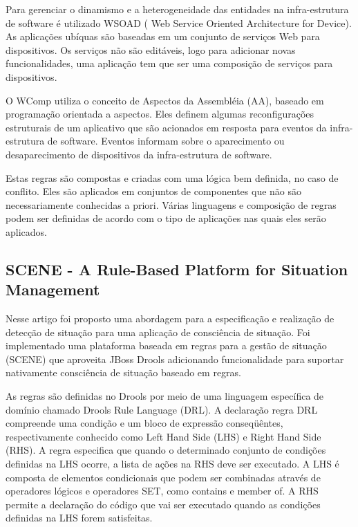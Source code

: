 \documentclass[12pt,a4paper,compsoc]{IEEEtran}
\begin{document}
  Para gerenciar o dinamismo e a heterogeneidade das entidades na infra-estrutura de software é
  utilizado WSOAD ( Web Service Oriented Architecture for Device). As aplicações ubíquas são
  baseadas em um conjunto de serviços Web para dispositivos. Os serviços não são editáveis, logo
  para adicionar novas funcionalidades, uma aplicação tem que ser uma composição de serviços para
  dispositivos.
  
  O WComp utiliza o conceito de Aspectos da Assembléia (AA), baseado em programação orientada a
  aspectos. Eles definem algumas reconfigurações estruturais de um aplicativo que são acionados em
  resposta para eventos da infra-estrutura de software. Eventos informam sobre o aparecimento ou
  desaparecimento de dispositivos da infra-estrutura de software.
  
  Estas regras são compostas e criadas com uma lógica bem definida, no caso de conflito. Eles são
  aplicados em conjuntos de componentes que não são necessariamente conhecidas a priori. Várias
  linguagens e composição de regras podem ser definidas de acordo com o tipo de aplicações nas
  quais eles serão aplicados.


\subsection{SCENE - A Rule-Based Platform for Situation Management}

  Nesse artigo foi proposto uma abordagem para a especificação e realização de detecção de situação
  para uma aplicação de consciência de situação. Foi implementado uma plataforma baseada em regras
  para a gestão de situação (SCENE) que aproveita JBoss Drools adicionando funcionalidade para
  suportar nativamente consciência de situação baseado em regras.
  
  As regras são definidas no Drools por meio de uma linguagem específica de domínio chamado Drools
  Rule Language (DRL). A declaração regra DRL compreende uma condição e um bloco de expressão
  conseqüêntes, respectivamente conhecido como  Left Hand Side (LHS) e Right Hand Side (RHS). A
  regra especifica que quando o determinado conjunto de condições definidas na LHS ocorre, a lista
  de ações na RHS deve ser executado. A LHS é composta de elementos condicionais que podem ser
  combinadas através de operadores lógicos e operadores SET, como  contains e member of. A RHS
  permite a declaração do código que vai ser executado quando as condições definidas na LHS forem
  satisfeitas.
  
\end{document}
